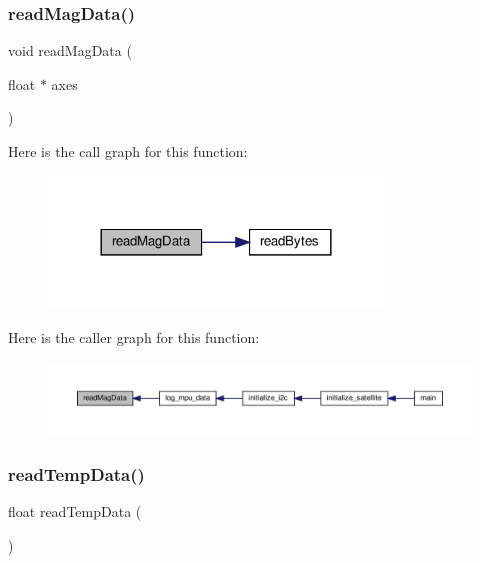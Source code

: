 \subsubsection{\texorpdfstring{read\+Mag\+Data()}{readMagData()}}
{\footnotesize\ttfamily void read\+Mag\+Data (\begin{DoxyParamCaption}\item[{float $\ast$}]{axes }\end{DoxyParamCaption})}

Here is the call graph for this function\+:
\nopagebreak
\begin{figure}[H]
\begin{center}
\leavevmode
\includegraphics[width=252pt]{i2c-interface_8c_a121c45c907088a8dcb84c0d72ded4f2b_cgraph}
\end{center}
\end{figure}
Here is the caller graph for this function\+:
\nopagebreak
\begin{figure}[H]
\begin{center}
\leavevmode
\includegraphics[width=350pt]{i2c-interface_8c_a121c45c907088a8dcb84c0d72ded4f2b_icgraph}
\end{center}
\end{figure}
\mbox{\label{i2c-interface_8c_aa12b154e59ddb443b65da8f4458146db}} 
\subsubsection{\texorpdfstring{read\+Temp\+Data()}{readTempData()}}
{\footnotesize\ttfamily float read\+Temp\+Data (\begin{DoxyParamCaption}{ }\end{DoxyParamCaption})}

